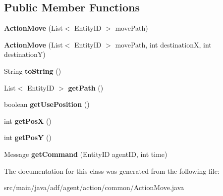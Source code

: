 \subsection*{Public Member Functions}
\begin{DoxyCompactItemize}
\item 
\hypertarget{classadf_1_1agent_1_1action_1_1common_1_1ActionMove_a446fb0a7f2d7ac5def8ccb4915e84443}{}\label{classadf_1_1agent_1_1action_1_1common_1_1ActionMove_a446fb0a7f2d7ac5def8ccb4915e84443} 
{\bfseries Action\+Move} (List$<$ Entity\+ID $>$ move\+Path)
\item 
\hypertarget{classadf_1_1agent_1_1action_1_1common_1_1ActionMove_aedc59794067e863a2881b623024f36eb}{}\label{classadf_1_1agent_1_1action_1_1common_1_1ActionMove_aedc59794067e863a2881b623024f36eb} 
{\bfseries Action\+Move} (List$<$ Entity\+ID $>$ move\+Path, int destinationX, int destinationY)
\item 
\hypertarget{classadf_1_1agent_1_1action_1_1common_1_1ActionMove_a73a448873ec5ef05f94369b7a0091183}{}\label{classadf_1_1agent_1_1action_1_1common_1_1ActionMove_a73a448873ec5ef05f94369b7a0091183} 
String {\bfseries to\+String} ()
\item 
\hypertarget{classadf_1_1agent_1_1action_1_1common_1_1ActionMove_a079ea88ac540e4c274d8590700843ed5}{}\label{classadf_1_1agent_1_1action_1_1common_1_1ActionMove_a079ea88ac540e4c274d8590700843ed5} 
List$<$ Entity\+ID $>$ {\bfseries get\+Path} ()
\item 
\hypertarget{classadf_1_1agent_1_1action_1_1common_1_1ActionMove_aaddb1fd9d8724f78dc645a534647de35}{}\label{classadf_1_1agent_1_1action_1_1common_1_1ActionMove_aaddb1fd9d8724f78dc645a534647de35} 
boolean {\bfseries get\+Use\+Position} ()
\item 
\hypertarget{classadf_1_1agent_1_1action_1_1common_1_1ActionMove_ab46a8688e7a400327e0709b5747227a3}{}\label{classadf_1_1agent_1_1action_1_1common_1_1ActionMove_ab46a8688e7a400327e0709b5747227a3} 
int {\bfseries get\+PosX} ()
\item 
\hypertarget{classadf_1_1agent_1_1action_1_1common_1_1ActionMove_a1e8adba10aa1ee1212e9be9e9a8fb4f8}{}\label{classadf_1_1agent_1_1action_1_1common_1_1ActionMove_a1e8adba10aa1ee1212e9be9e9a8fb4f8} 
int {\bfseries get\+PosY} ()
\item 
\hypertarget{classadf_1_1agent_1_1action_1_1common_1_1ActionMove_a0c0647b59ef2030d756dd8023acabf17}{}\label{classadf_1_1agent_1_1action_1_1common_1_1ActionMove_a0c0647b59ef2030d756dd8023acabf17} 
Message {\bfseries get\+Command} (Entity\+ID agent\+ID, int time)
\end{DoxyCompactItemize}


The documentation for this class was generated from the following file\+:\begin{DoxyCompactItemize}
\item 
src/main/java/adf/agent/action/common/Action\+Move.\+java\end{DoxyCompactItemize}
